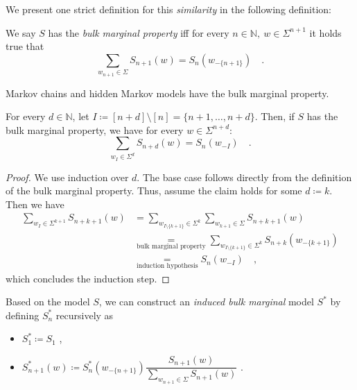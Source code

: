 \documentclass[../../main.tex]{subfiles}
\begin{document}
    We present one strict definition for this \emph{similarity} in the following definition:

    \begin{definition}
        We say $S$ has the \emph{bulk marginal property} iff for every $n \in \mathbb{N}, \ w \in \Sigma^{n + 1}$ it holds true that
        \[
            \sum_{w_{n + 1} \in \Sigma} S_{n + 1}(w) = S_n(w_{-\{n + 1\}}) \quad .
        \]
    \end{definition}

    \begin{remark}
        Markov chains and hidden Markov models have the bulk marginal property.
    \end{remark}

\pagebreak
    \begin{lemma}
        \label{lemma:random_variables_do_not_change_with_future_models}
        For every $d \in \mathbb{N}$, let $I \coloneqq [n + d] \setminus [n] = \{ n+1, \dots, n + d \}$. Then, if $S$ has the bulk marginal property, we have for every $w \in \Sigma^{n + d}$:
        \[
            \sum_{w_I \in \Sigma^d} S_{n + d}(w) = S_n(w_{-I}) \quad .
        \]
    \end{lemma}
    \begin{proof}
        We use induction over $d$. The base case follows directly from the definition of the bulk marginal property. Thus, assume the claim holds for some $d \coloneqq k$. Then we have
        \begin{align*}
            \sum_{w_I \in \Sigma^{k + 1}} S_{n + k + 1}(w) &= \sum_{w_{I \setminus \{ k + 1 \}} \in \Sigma^{k}} \sum_{w_{k + 1} \in \Sigma} S_{n + k + 1}(w) \\
            &\underset{\text{bulk marginal property}}{=} \sum_{w_{I \setminus \{ k + 1 \}} \in \Sigma^{k}} S_{n + k}(w_{-\{ k + 1 \}}) \\
            &\underset{\text{induction hypothesis}}{=} S_n(w_{-I}) \quad ,
        \end{align*}
        which concludes the induction step.
    \end{proof}

    \begin{definition}
        Based on the model $S$, we can construct an \emph{induced bulk marginal} model $S^*$ by defining $S_n^*$ recursively as 
        \begin{itemize}
            \item $S_1^* \coloneqq S_1$ ,
            \item $S_{n + 1}^*(w) \coloneqq S_n^*(w_{-\{n+1\}}) \dfrac{S_{n+1}(w)}{\sum_{w_{n+1} \in \Sigma} S_{n+1}(w)}$ .
        \end{itemize}
    \end{definition}
\end{document}
